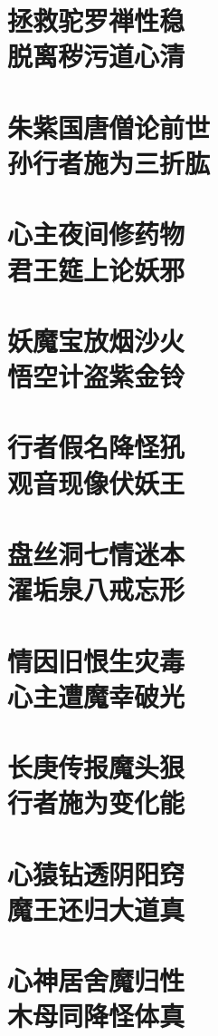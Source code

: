 \documentclass[a4paper,12pt,UTF8,twoside]{ctexbook}
\begin{document}
\chapter[拯救驼罗禅性稳\ 脱离秽污道心清]{拯救驼罗禅性稳\\脱离秽污道心清}
\chapter[朱紫国唐僧论前世\ 孙行者施为三折肱]{朱紫国唐僧论前世\\孙行者施为三折肱}
\chapter[心主夜间修药物\ 君王筵上论妖邪]{心主夜间修药物\\君王筵上论妖邪}
\chapter[妖魔宝放烟沙火\ 悟空计盗紫金铃]{妖魔宝放烟沙火\\悟空计盗紫金铃}
\chapter[行者假名降怪犼\ 观音现像伏妖王]{行者假名降怪犼\\观音现像伏妖王}
\chapter[盘丝洞七情迷本\ 濯垢泉八戒忘形]{盘丝洞七情迷本\\濯垢泉八戒忘形}
\chapter[情因旧恨生灾毒\ 心主遭魔幸破光]{情因旧恨生灾毒\\心主遭魔幸破光}
\chapter[长庚传报魔头狠\ 行者施为变化能]{长庚传报魔头狠\\行者施为变化能}
\chapter[心猿钻透阴阳窍\ 魔王还归大道真]{心猿钻透阴阳窍\\魔王还归大道真}
\chapter[心神居舍魔归性\ 木母同降怪体真]{心神居舍魔归性\\木母同降怪体真}
\end{document}
